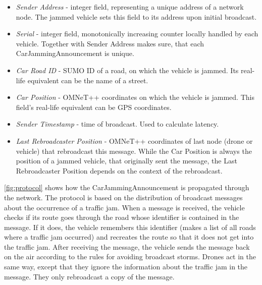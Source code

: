 \documentclass[]{nsm-thesis}
\begin{document}
\begin{itemize}

\item \emph{Sender Address} - integer field, representing a unique address of a network node. The jammed vehicle sets this field to its address upon initial broadcast.

\item \emph{Serial} - integer field, monotonically increasing counter locally handled by each vehicle. Together with Sender Address makes sure, that each CarJammingAnnouncement is unique.

\item \emph{Car Road ID} - SUMO ID of a road, on which the vehicle is jammed. Its real-life equivalent can be the name of a street.

\item \emph{Car Position} - OMNeT++ coordinates on which the vehicle is jammed. This field's real-life equivalent can be GPS coordinates.

\item \emph{Sender Timestamp} - time of broadcast. Used to calculate latency.

\item \emph{Last Rebroadcaster Position} - OMNeT++ coordinates of last node (drone or vehicle) that rebroadcast this message. While the Car Position is always the position of a jammed vehicle, that originally sent the message, the Last Rebroadcaster Position depends on the context of the rebroadcast.

\end{itemize}

\cref{fig:protocol} shows how the CarJammingAnnouncement is propagated through the network. The protocol is based on the distribution of broadcast messages about the occurrence of a traffic jam. When a message is received, the vehicle checks if its route goes through the road whose identifier is contained in the message. If it does, the vehicle remembers this identifier (makes a list of all roads where a traffic jam occurred) and recreates the route so that it does not get into the traffic jam. After receiving the message, the vehicle sends the message back on the air according to the rules for avoiding broadcast storms. Drones act in the same way, except that they ignore the information about the traffic jam in the message. They only rebroadcast a copy of the message.
\end{document}
